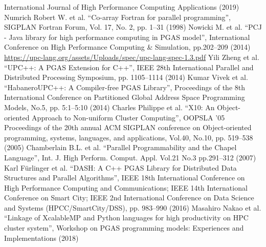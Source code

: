 \begin{thebibliography}{99.}
  International Journal of High Performance Computing Applications (2019)
%
 Numrich Robert W. et al.
``Co-array Fortran for parallel programming'',
SIGPLAN Fortran Forum, Vol. 17, No. 2, pp. 1--31 (1998)
%
 Nowicki M. et al.
  ``PCJ - Java library for high performance computing in PGAS model'',
   International Conference on High Performance Computing \& Simulation, pp.202--209 (2014)
%
 \url{https://upc-lang.org/assets/Uploads/spec/upc-lang-spec-1.3.pdf}
%
 Yili Zheng et al.
  ``UPC++: A PGAS Extension for C++'',  IEEE 28th International Parallel and Distributed Processing Symposium, pp. 1105--1114 (2014)
%
 Kumar Vivek et al.
``HabaneroUPC++: A Compiler-free PGAS Library'', 
  Proceedings of the 8th International Conference on Partitioned Global Address Space Programming Models,
  No.5, pp. 5:1--5:10 (2014)
%
 Charles Philippe et al.
``X10: An Object-oriented Approach to Non-uniform Cluster Computing'',
OOPSLA '05 Proceedings of the 20th annual ACM SIGPLAN conference on Object-oriented programming, systems, languages, and applications, Vol.40, No.10, pp. 519--538 (2005)
%
 Chamberlain B.L. et al.
``Parallel Programmability and the Chapel Language'',
Int. J. High Perform. Comput. Appl. Vol.21 No.3 pp.291--312 (2007)
%
 Karl F{\"{u}}rlinger et al.
``DASH: A C++ PGAS Library for Distributed Data Structures and Parallel Algorithms'',
  IEEE 18th International Conference on High Performance Computing and Communications; IEEE 14th International Conference on Smart City; IEEE 2nd International Conference on Data Science and Systems (HPCC/SmartCity/DSS), pp. 983--990 (2016)
%
 Masahiro Nakao et al.
``Linkage of XcalableMP and Python languages for high productivity on HPC cluster system'',
Workshop on PGAS programming models: Experiences and Implementations (2018)
\end{thebibliography}
